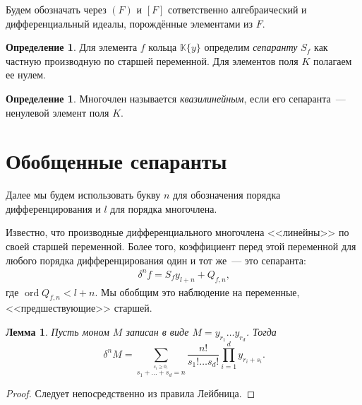 \documentclass[11pt]{article}
\DeclareMathOperator{\ord}{ord}
\renewcommand{\ge}{\geqslant}
\theoremstyle{plain1}
\newtheorem{lemma}[theorem1]{Лемма}
\theoremstyle{plain2}
\theoremstyle{plain}
\theoremstyle{plain3}
\theoremstyle{definition}
\newtheorem{definition}[theorem2]{Определение}
\theoremstyle{remark}
\begin{document}
Будем обозначать через $(F)$ и $[F]$ сответственно алгебраический и дифференциальный идеалы, порождённые элементами из $F$.

\begin{definition}
Для элемента $f$ кольца $\mathbb{K}\{y\}$ определим \emph{сепаранту} $S_f$
как частную производную по старшей переменной. Для элементов поля $K$ полагаем ее нулем.
\end{definition}

\begin{definition} Многочлен называется \emph{квазилинейным}, если
его сепаранта~--- ненулевой элемент поля $K$.
\end{definition}



\section{Обобщенные сепаранты}
\label{generalized_separants}
Далее мы будем использовать букву $n$ для обозначения порядка дифференцирования и $l$ для порядка многочлена.

Известно, что производные дифференциального многочлена <<линейны>> по своей старшей переменной. Более того, коэффициент перед этой переменной для любого порядка дифференцирования один и тот же~--- это сепаранта:
\begin{gather}
\label{separant_formula}
 \,\delta^n f = S_f y_{l+n} + Q_{f,n},
\end{gather}
где $\ord Q_{f,n} < l + n$.
Мы обобщим это наблюдение на переменные, <<предшествующие>> старшей.


\begin{lemma}\label{lemma:der_monom}
Пусть моном $M$ записан в виде $M=y_{r_1}\ldots y_{r_d}$. Тогда
$$
\,\delta^n M =\sum\limits_{\stackrel{s_i\ge0,}{
s_1+\ldots+s_d=n}}\frac{n!}{s_1!\ldots s_d!}
\prod\limits_{i=1}^dy_{r_i+s_i}.
$$
\end{lemma}
\begin{proof}
Следует непосредственно из правила Лейбница.
\end{proof}
\end{document}
